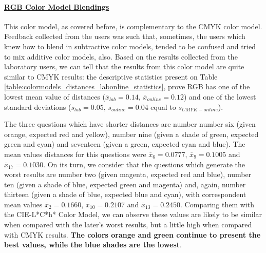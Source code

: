 \paragraph{\ul{RGB Color Model Blendings}}
\label{subsubsec:rgbcolormodel}
%
This color model, as covered before, is complementary to the CMYK color model. Feedback collected from the users was such that, sometimes, the users which knew how to blend in subtractive color models,
tended to be confused and tried to mix additive color models, also. Based on the results collected from the laboratory users, we can tell that the results from this color model are quite similar to CMYK results: the descriptive statistics present
on Table \ref{table:colormodels_distances_labonline_statistics}, prove RGB has one of the lowest mean value of distances ($\overline{x}_{lab} = 0.14$, $\overline{x}_{online} = 0.12$) and one of
the lowest standard deviations ($s_{lab} = 0.05$, $s_{online} = 0.04$ equal to $s_{CMYK-online}$). \par
%
The three questions which have shorter distances are number number six (given orange, expected red and yellow), number nine (given a shade of green, expected green and cyan) and seventeen (given a green, expected cyan and blue). The mean values
distances for this questions were $\overline{x}_{6} = 0.0777$, $\overline{x}_{9} = 0.1005$ and $\overline{x}_{17} = 0.1030$.
On its turn, we consider that the questions which generate the worst results are number two (given magenta, expected red and blue), number ten (given a shade of blue, expected green and magenta) and, again, number thirteen (given a shade of blue,
expected blue and cyan), with correspondent mean values $\overline{x}_{2} = 0.1660$, $\overline{x}_{10} = 0.2107$ and $\overline{x}_{13} = 0.2450$.
Comparing them with the CIE-L*C*h* Color Model, we can observe these values are likely to be similar when compared with the later's worst results, but a little high when compared with CMYK results. \textbf{The colors orange and green continue to
present the best values, while the blue shades are the lowest}. \par
%
